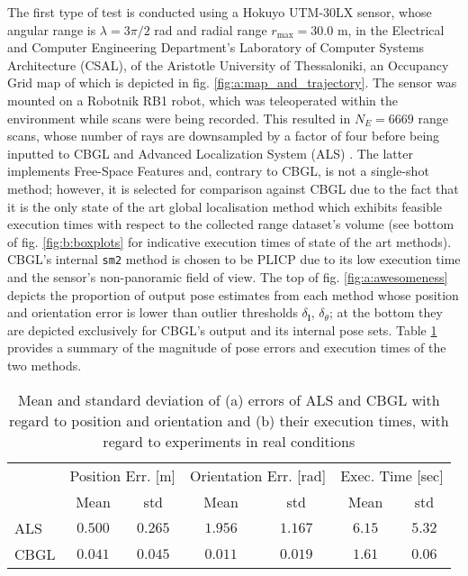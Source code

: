 The first type of test is conducted using a Hokuyo UTM-30LX sensor, whose
angular range is $\lambda = 3\pi/2$ rad and radial range $r_{\max} = 30.0$ m,
in the  Electrical and Computer Engineering Department's Laboratory of Computer
Systems Architecture (CSAL), of the Aristotle University of Thessaloniki, an
Occupancy Grid map of which is depicted in fig.
\ref{fig:a:map_and_trajectory}. The sensor was mounted on a Robotnik RB1 robot,
which was teleoperated within the environment while scans were being recorded.
This resulted in $N_E = 6669$ range scans, whose number of rays are downsampled
by a factor of four before being inputted to CBGL and Advanced Localization
System (ALS) \cite{als_jp}. The latter implements Free-Space Features
\cite{als_eth} and, contrary to CBGL, is not a single-shot method;
however, it is selected for comparison against CBGL due to the fact that it is
the only state of the art global localisation method which exhibits feasible
execution times with respect to the collected range dataset's volume (see
bottom of fig.  \ref{fig:b:boxplots} for indicative execution times of state of
the art methods). CBGL's internal \texttt{sm2} method is chosen to be PLICP
\cite{Censi2008c} due to its low execution time and the sensor's non-panoramic
field of view. The top of fig. \ref{fig:a:awesomeness} depicts the proportion
of output pose estimates from each method whose position and orientation error
is lower than outlier thresholds $\delta_{\bm{l}}$, $\delta_{\theta}$; at the
bottom they are depicted exclusively for CBGL's output and its internal pose
sets. Table \ref{tbl:a} provides a summary of the magnitude of pose errors and
execution times of the two methods.

\begin{table}[]\footnotesize
\begin{tabular}{@{}lcccccc@{}}
     & \multicolumn{2}{l}{Position Err. {[}m{]}} & \multicolumn{2}{l}{Orientation Err. {[}rad{]}} & \multicolumn{2}{l}{Exec. Time {[}sec{]}} \\
     & Mean              & std              & Mean                & std                 & Mean                & std                \\ \midrule
ALS  & $0.500 $          & $0.265 $         & $1.956 $            & $1.167 $            & $6.15 $             & $5.32 $            \\
CBGL & $0.041 $          & $0.045 $         & $0.011 $            & $0.019 $            & $1.61 $             & $0.06 $            \\ \bottomrule
\end{tabular}
  \caption{\small Mean and standard deviation of (a) errors of ALS and CBGL with
                regard to position and orientation and (b) their execution times,
                with regard to experiments in real conditions}
\label{tbl:a}
\end{table}


